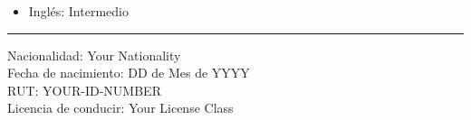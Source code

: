 \documentclass[11pt, a4paper]{article}
\begin{document}
\vspace{2pt}

\begin{itemize}[leftmargin=1.5em, itemsep=1pt, topsep=2pt]
  \item Inglés: Intermedio
\end{itemize}


\vspace{6pt}\vspace{2pt}\hrule\vspace{4pt}

\noindent Nacionalidad: Your Nationality\\
\noindent Fecha de nacimiento: DD de Mes de YYYY\\
\noindent RUT: YOUR-ID-NUMBER\\
\noindent Licencia de conducir: Your License Class
\end{document}
